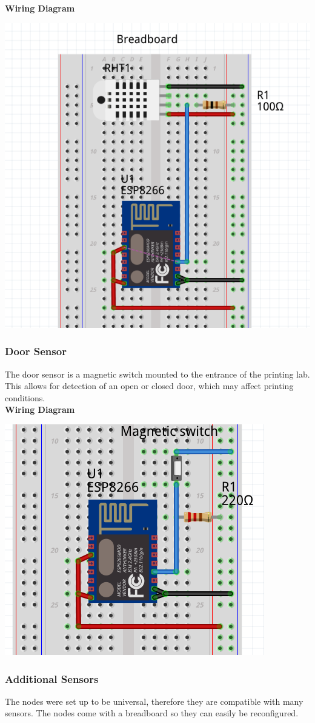       \textbf{Wiring Diagram}\\
            \begin{center}
      \includegraphics[scale=0.25]{images/temp-diagram.png}
\end{center}

    \subsubsection{Door Sensor}
      The door sensor is a magnetic switch mounted to the entrance of the printing lab.
      This allows for detection of an open or closed door, which may affect printing conditions.\\

      \textbf{Wiring Diagram}\\
      \begin{center}
        \includegraphics[scale=0.25]{images/door-cir.png}
        \end{center}
    \subsubsection{Additional Sensors}
      The nodes were set up to be universal, therefore they are compatible with
      many sensors. The nodes come with a breadboard so they can
      easily be reconfigured.\\
